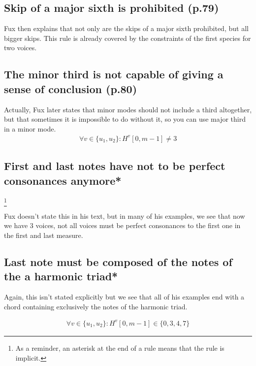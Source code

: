 \subsection{\reddot Skip of a major sixth is prohibited (p.79)}
Fux then explains that not only are the skips of a major sixth prohibited, but all bigger skips. This rule is already covered by the constraints of the first species for two voices. 

\subsection{\reddot The minor third is not capable of giving a sense of conclusion (p.80)}
Actually, Fux later states that minor modes should not include a third altogether, but that sometimes it is impossible to do without it, so you can use major third in a minor mode.
\begin{equation} \begin{aligned}
\forall v \in \{u_1, u_2\} \colon H^{v}[0, m-1] \neq 3
\end{aligned} \end{equation}


\subsection{\reddot First and last notes have not to be perfect consonances anymore*} \label{rule:last-chord-not-perfect-anymore}
\footnote{As a reminder, an asterisk at the end of a rule means that the rule is implicit.}

Fux doesn't state this in his text, but in many of his examples, we see that now we have 3 voices, not all voices must be perfect consonances to the first one in the first and last measure.

\subsection{\reddot Last note must be composed of the notes of the a harmonic triad*} \label{rule:last-chord-h-triad}
Again, this isn't stated explicitly but we see that all of his examples end with a chord containing exclusively the notes of the harmonic triad.

\begin{equation} \begin{aligned}
\forall v \in \{u_1, u_2\} \colon H^{v}[0, m-1] \in \{0, 3, 4, 7\}
\end{aligned} \end{equation}



